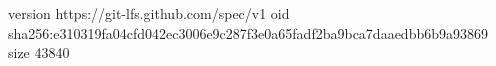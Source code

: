 version https://git-lfs.github.com/spec/v1
oid sha256:e310319fa04cfd042ec3006e9c287f3e0a65fadf2ba9bca7daaedbb6b9a93869
size 43840
